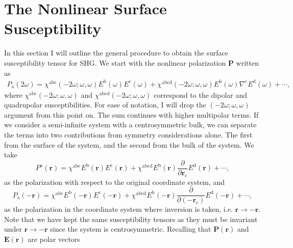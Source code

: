 \chapter{The Nonlinear Surface Susceptibility}\label{chap:chi2}
\partialtoc

In this section I will outline the general procedure to obtain the surface
susceptibility tensor for SHG. We start with the nonlinear polarization
$\mathbf{P}$ written as
\begin{equation}\label{mshg}
\begin{split}
P_{\mathrm{a}}(2\omega)
= \chi^{\mathrm{abc}}(-2\omega;\omega,\omega)
  E^{\mathrm{b}}(\omega)E^{\mathrm{c}}(\omega)
+ \chi^{\mathrm{abcd}}(-2\omega;\omega,\omega)
  E^{\mathrm{b}}(\omega)\nabla^{\mathrm{c}}E^{\mathrm{d}}(\omega)
+ \cdots,
\end{split}
\end{equation}
where $\chi^{\mathrm{abc}}(-2\omega;\omega,\omega)$ and
$\chi^{\mathrm{abcd}}(-2\omega;\omega,\omega)$ correspond to the dipolar and
quadrupolar susceptibilities. For ease of notation, I will drop the
$(-2\omega;\omega,\omega)$ argument from this point on. The sum continues with
higher multipolar terms. If we consider a semi-infinite system with a
centrosymmetric bulk, we can separate the terms into two contributions from
symmetry considerations alone. The first from the surface of the system, and the
second from the bulk of the system. We take
\begin{equation}\label{mshg2}
P^{\mathrm{a}}(\mathbf{r})
= \chi^{\mathrm{abc}}E^{\mathrm{b}}(\mathbf{r})E^{\mathrm{c}}(\mathbf{r})
+ \chi^{\mathrm{abcd}}E^{\mathrm{b}}(\mathbf{r})
  \frac{\partial}{\partial\mathbf{r}_{\mathrm{c}}}E^{\mathrm{d}}(\mathbf{r}) 
+ \cdots,
\end{equation}
as the polarization with respect to the original coordinate system, and 
\begin{equation}\label{mshg3}
P_{\mathrm{a}}(-\mathbf{r})
= \chi^{\mathrm{abc}}E^{\mathrm{b}}(-\mathbf{r})E^{\mathrm{c}}(-\mathbf{r})
+ \chi^{\mathrm{abcd}}E^{\mathrm{b}}(-\mathbf{r})
  \frac{\partial}{\partial(-\mathbf{r}_{\mathrm{c}})}E^{\mathrm{d}}(-\mathbf{r}) 
+ \cdots, 
\end{equation}
as the polarization in the coordinate system where inversion is taken, i.e.
$\mathbf{r} \rightarrow -\mathbf{r}$. Note that we have kept the same
susceptibility tensors as they must be invariant under $\mathbf{r} \to
-\mathbf{r}$ since the system is centrosymmetric. Recalling that
$\mathbf{P}(\mathbf{r})$ and $\mathbf{E}(\mathbf{r})$ are polar vectors
